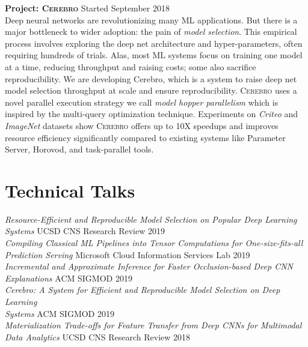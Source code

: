 \documentclass[margin]{res}
\begin{document}
\begin{resume}
\textbf{Project: \textsc{Cerebro}} \hfill Started September 2018\\
Deep neural networks are revolutionizing many ML applications.
But there is a major bottleneck to wider adoption: the pain of \textit{model selection}.
This empirical process involves exploring the deep net architecture and hyper-parameters, often requiring hundreds of trials.
Alas, most ML systems focus on training one model at a time, reducing throughput and raising costs; some also sacrifice reproducibility.
We are developing {Cerebro}, which is a system to raise deep net model selection throughput at scale and ensure reproducibility.
\textsc{Cerebro} uses a novel parallel execution strategy we call \textit{model hopper parallelism} which is inspired by the multi-query optimization technique.
Experiments on \textit{Criteo} and \textit{ImageNet} datasets show \textsc{Cerebro} offers up to 10X speedups and improves resource efficiency significantly compared to existing systems like Parameter Server, Horovod, and task-parallel tools.


\section{Technical Talks}
\textit{Resource-Efficient and Reproducible Model Selection on Popular Deep Learning\\ Systems} \hfill UCSD CNS Research Review 2019\\
\textit{Compiling Classical ML Pipelines into Tensor Computations for One-size-fits-all Prediction Serving} \hfill Microsoft Cloud Information Services Lab 2019\\
\textit{Incremental and Approximate Inference for Faster Occlusion-based Deep CNN Explanations} \hfill ACM SIGMOD 2019\\
\textit{Cerebro: A System for Efficient and Reproducible Model Selection on Deep Learning \\Systems} \hfill ACM SIGMOD 2019\\
\textit{Materialization Trade-offs for Feature Transfer from Deep CNNs for Multimodal Data Analytics} \hfill UCSD CNS Research Review 2018\\



\end{resume}
\end{document}
